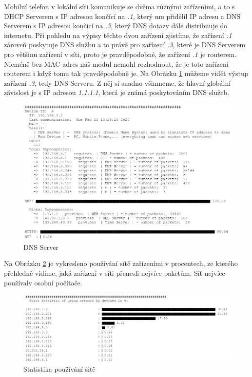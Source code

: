 \documentclass[thesis=B,czech,hidelinks]{FITthesis}[2019/03/21]
\begin{document}
    
    Mobilní telefon v lokální síti komunikuje se dvěma různými zařízeními, a to s DHCP Serverem s IP adresou končící na \emph{.1}, který mu přidělil IP adresu a DNS Serverem s IP adresou končící na \emph{.3}, který DNS dotazy dále distribuuje do internetu. Při pohledu na výpisy těchto dvou zařízení zjistíme, že zařízení \emph{.1} zároveň poskytuje DNS službu a to právě pro zařízení \emph{.3}, které je DNS Serverem pro většinu zařízení v síti, proto je pravděpodobné, že zařízení \emph{.1} je routerem. Nicméně bez MAC adres náš modul nemohl rozhodnout, že je toto zařízení routerem i když tomu tak pravděpodobně je. Na Obrázku \ref{DNSServer} můžeme vidět výstup zařízení \emph{.3}, tedy DNS Serveru. Z něj si snadno všimneme, že hlavní globální závislost je s IP adresou \emph{1.1.1.1}, která je známá poskytováním DNS služeb.
    
    \begin{figure}[h!]
        \centering
        \includegraphics[width=\textwidth]{DNSServer.png}
        \caption[Ukázka měření: DNS Server v kancelářské síti]{DNS Server}
        \label{DNSServer}
    \end{figure}
    
    Na Obrázku \ref{Statistic} je vykresleno používání sítě zařízeními v procentech, ze kterého přehledně vidíme, jaká zařízení v síti přenesli nejvíce paketům. Síť nejvíce používaly osobní počítače.
    
    \begin{figure}[h!]
        \centering
        \includegraphics[width=\textwidth]{statistic.png}
        \caption[Ukázka měření: Statistika pro síť v kanceláři]{Statistika používání sítě}
        \label{Statistic}
    \end{figure}
    
\end{document}
